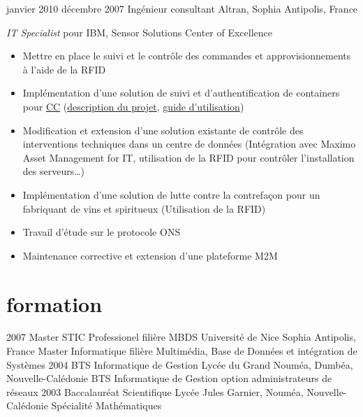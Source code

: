 \documentclass[]{roger-cv}
\begin{document}
\begin{entrylist}
  \entry
    {janvier 2010}
    {décembre 2007}
    {Ingénieur consultant}
    {Altran, Sophia Antipolis, France}  
    {
      \emph{IT Specialist} pour IBM, Sensor Solutions Center of Excellence\\
      \vspace{-3mm}
          \begin{itemize}
 	    \item Mettre en place le suivi et le contrôle des commandes et approvisionnements à l'aide de la RFID
 	    \item Implémentation d'une solution de suivi et d'authentification de containers pour \href{http://www.container-centralen.com/}{CC} (\href{http://www.container-centralen.co.uk/rfid/history.aspx}{description du projet}, \href{http://www.container-centralen.co.uk/rfid/user\%20guide\%20for\%20scanning.aspx}{guide d'utilisation})
               \item Modification et extension d'une solution existante de contrôle des interventions techniques dans un centre de données 
 	    (Intégration avec Maximo Asset Management for IT, utilisation de la RFID pour contrôler l'installation des serveurs\ldots)
 	    \item Implémentation d'une solution de lutte contre la contrefaçon pour un fabriquant de vins et spiritueux (Utilisation de la RFID)
 	    \item Travail d'étude sur le protocole ONS
 	    \item Maintenance corrective et extension d'une plateforme M2M
 	\end{itemize}
    }

\end{entrylist}

\section{formation}

\begin{entrylist}
  \entry
    {2007}
    {}
    {Master STIC Professionel {\normalfont filière MBDS}}
    {Université de Nice Sophia Antipolis, France}
    {Master Informatique filière Multimédia, Base de Données et intégration de Systèmes}
  \entry
    {2004}
    {}
    {BTS Informatique de Gestion}
    {Lycée du Grand Nouméa, Dumbéa, Nouvelle-Calédonie}
    {BTS Informatique de Gestion option administrateurs de réseaux}
  \entry
    {2003}
    {}
    {Baccalauréat Scientifique}
    {Lycée Jules Garnier, Nouméa, Nouvelle-Calédonie}
    {Spécialité Mathématiques}
\end{entrylist}
\end{document}
